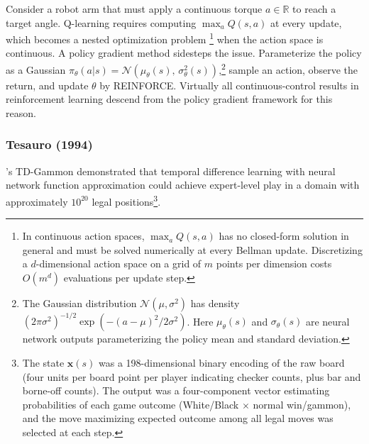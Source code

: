 Consider a robot arm that must apply a continuous torque $a \in \mathbb{R}$ to reach a target angle. Q-learning requires computing $\max_a Q(s,a)$ at every update, which becomes a nested optimization problem \footnote{In continuous action spaces, $\max_a Q(s,a)$ has no closed-form solution in general and must be solved numerically at every Bellman update. Discretizing a $d$-dimensional action space on a grid of $m$ points per dimension costs $O(m^d)$ evaluations per update step.} when the action space is continuous. A policy gradient method sidesteps the issue. Parameterize the policy as a Gaussian $\pi_\theta(a|s) = \mathcal{N}(\mu_\theta(s),\, \sigma_\theta^2(s))$,\footnote{The Gaussian distribution $\mathcal{N}(\mu, \sigma^2)$ has density $(2\pi\sigma^2)^{-1/2}\exp(-(a-\mu)^2/2\sigma^2)$. Here $\mu_\theta(s)$ and $\sigma_\theta(s)$ are neural network outputs parameterizing the policy mean and standard deviation.} sample an action, observe the return, and update $\theta$ by REINFORCE. Virtually all continuous-control results in reinforcement learning descend from the policy gradient framework for this reason.


\subsubsection{Tesauro (1994)}

\citet{tesauro1994}'s TD-Gammon demonstrated that temporal difference learning with neural network function approximation could achieve expert-level play in a domain with approximately $10^{20}$ legal positions\footnote{The state $\mathbf{x}(s)$ was a 198-dimensional binary encoding of the raw board (four units per board point per player indicating checker counts, plus bar and borne-off counts). The output was a four-component vector estimating probabilities of each game outcome (White/Black $\times$ normal win/gammon), and the move maximizing expected outcome among all legal moves was selected at each step.}. 

